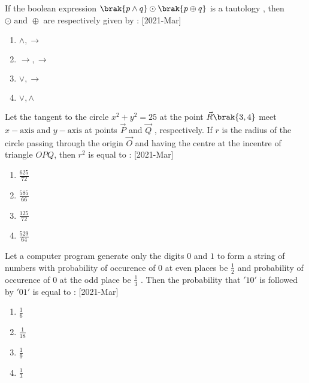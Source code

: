 
\iffalse
\title{2021}
\author{ee24btech11011}
\section{mcq-single}
\fi
    \item If the boolean expression $\brak{p \land q} \odot \brak{p \oplus q}$ is a tautology , then $\odot  \text{ and }  \oplus$ are respectively given by :
	    \hfill[2021-Mar]
    \begin{multicols}{2}
    \begin{enumerate}
        \item $\land , \rightarrow$
        \item $\rightarrow , \rightarrow$
        \item $ \lor , \rightarrow$
        \item $ \lor , \land$
    \end{enumerate}
    \end{multicols}
    \item Let the tangent to the circle $x^2 + y^2 = 25$ at the point $\vec{R}\brak{3,4}$ meet $x-\text{axis}$ and $y-\text{axis}$ at points $\vec{P}$ and $\vec{Q}$ , respectively. If $r$ is the radius of the circle passing through the origin $\vec{O}$ and having the centre at the incentre of triangle $OPQ$, then $r^2$ is equal to : \hfill[2021-Mar]
    \begin{multicols}{2}
    \begin{enumerate}
        \item $\frac{625}{72}$\\
        \item $\frac{585}{66}$
        \item $\frac{125}{72}$\\
        \item $\frac{529}{64}$
    \end{enumerate}
    \end{multicols}
    \item Let a computer program generate only the digits $0$ and $1$ to form a string of numbers with probability of occurence of $0$ at even places be $\frac{1}{2}$ and probability of occurence of $0$ at the odd place be $\frac{1}{3}$ . Then the probability that $'10'$ is followed by $'01'$ is equal to : \hfill[2021-Mar]
    \begin{multicols}{2}
        \begin{enumerate}
            \item $\frac{1}{6}$\\
            \item $\frac{1}{18}$
            \item $\frac{1}{9}$\\
            \item $\frac{1}{3}$
        \end{enumerate}
    \end{multicols}

